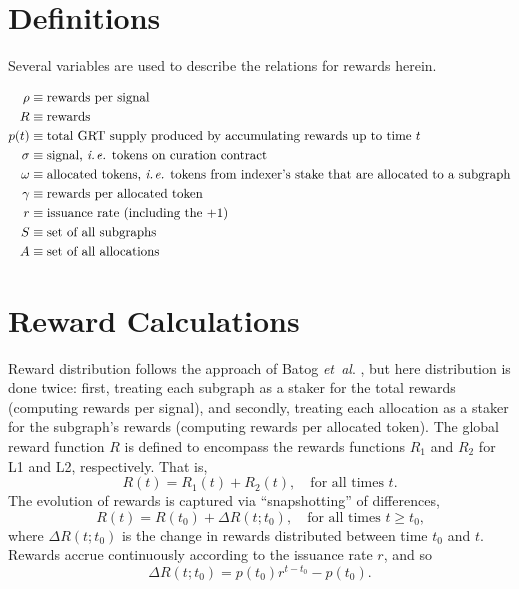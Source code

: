 {\newpage

\section*{Definitions}
Several variables are used to describe the relations for rewards herein.  

\begin{subequations}
\begin{align}
    \rho & \equiv \mbox{rewards per signal} \\
    R & \equiv \mbox{rewards} \\
    p(t) & \equiv \mbox{total GRT supply produced by accumulating rewards up to time $t$} \\
    \sigma & \equiv \mbox{signal, \ie tokens on curation contract} \\
    \omega & \equiv \mbox{allocated tokens, \ie tokens from indexer's stake that are allocated to a subgraph} \\
    \gamma & \equiv \mbox{rewards per allocated token} \\
    r & \equiv \mbox{issuance rate (including the $+1$)} \\
    S & \equiv \mbox{set of all subgraphs} \\
    A & \equiv \mbox{set of all allocations}
\end{align}
\end{subequations}


\section*{Reward Calculations}

Reward distribution follows the approach of Batog \textit{et\ al}. \cite{batog2018scalable}, but here distribution is done twice: first, treating each subgraph as a staker for the total rewards (computing rewards per signal), and secondly, treating each allocation as a staker for the subgraph’s rewards (computing rewards per allocated token). 
The global reward function $R$ is defined to encompass  the rewards functions $R_1$ and $R_2$ for L1 and L2, respectively. That is,
\begin{equation}
    R(t) = R_1(t) + R_2(t),
    \quad \mbox{for all times $t$.}
\end{equation}
The evolution of rewards is captured via ``snapshotting'' of differences, \ie 
\begin{equation}
    R(t) = R(t_0) + \Delta R(t; t_0),
    \quad \mbox{for all times $t \geq t_0$,}
\end{equation}
where $\Delta R(t; t_0)$ is the change in rewards distributed between time $t_0$ and $t$.
Rewards accrue continuously according to the issuance rate $r$, and so
\begin{equation}
    \Delta R(t; t_0) = p(t_0) r^{t-t_0} - p(t_0).
\end{equation}

}
